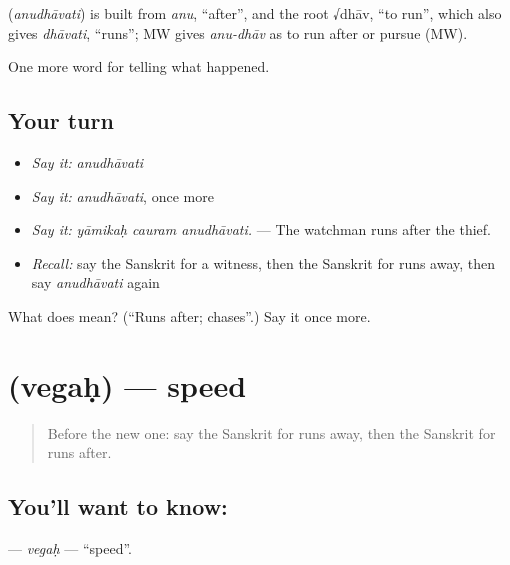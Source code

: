\begin{cousinweb}
\textbf{} (\emph{anudhāvati}) is built from \emph{anu}, \textquotedblleft{}after\textquotedblright{}, and the root √dhāv, \textquotedblleft{}to run\textquotedblright{}, which also gives \emph{dhāvati}, \textquotedblleft{}runs\textquotedblright{}; MW gives \emph{anu-dhāv} as to run after or pursue (MW).
\end{cousinweb}

\begin{grammarlens}[title={What you've built}]
One more word for telling what happened.
\end{grammarlens}

\subsection*{Your turn}
\begin{itemize}
\raggedright
  \item \emph{Say it:} \emph{anudhāvati}
  \item \emph{Say it:} \emph{anudhāvati}, once more
  \item \emph{Say it:} \emph{yāmikaḥ cauram anudhāvati.} — The watchman runs after the thief.
  \item \emph{Recall:} say the Sanskrit for a witness, then the Sanskrit for runs away, then say \emph{anudhāvati} again
\end{itemize}

\begin{tcolorbox}[breakable,colback=teal!4,colframe=teal!35!black,title={Before you move on}]
What does  mean? (\textquotedblleft{}Runs after; chases\textquotedblright{}.) Say it once more.
\end{tcolorbox}
\section[\texorpdfstring{\sk{वेगः} (vegaḥ)}{वेगः (vegaḥ)}]{ (vegaḥ) — speed}

\label{lesson:SA-C287-vegah}



\begin{quote}
Before the new one: say the Sanskrit for runs away, then the Sanskrit for runs after.
\end{quote}

\subsection*{You'll want to know: }
\textbf{} — \emph{vegaḥ} — \textquotedblleft{}speed\textquotedblright{}.

